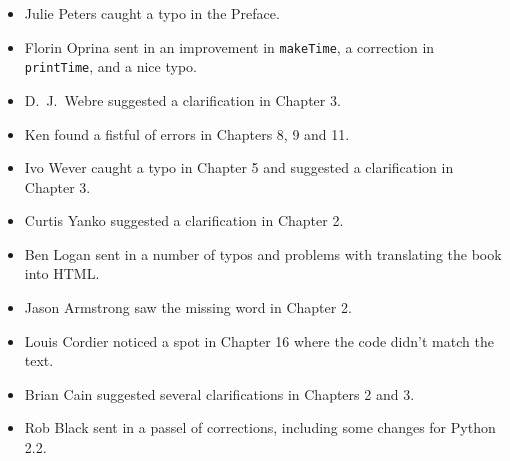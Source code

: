 \begin{itemize}

\item Julie Peters caught a typo in the Preface.

\item Florin Oprina sent in an improvement in {\tt makeTime},
a correction in {\tt printTime}, and a nice typo.

\item D.~J.~Webre suggested a clarification in Chapter 3.


\item Ken found a fistful of errors in Chapters 8, 9 and 11.

\item Ivo Wever caught a typo in Chapter 5 and suggested a clarification
in Chapter 3.


\item Curtis Yanko suggested a clarification in Chapter 2.

\item Ben Logan sent in a number of typos and problems with translating
the book into HTML.



\item Jason Armstrong saw the missing word in Chapter 2.

\item Louis Cordier noticed a spot in Chapter 16 where the code
didn't match the text.

\item Brian Cain suggested several clarifications in Chapters 2 and 3.

\item Rob Black sent in a passel of corrections, including some
changes for Python 2.2.


\end{itemize}
